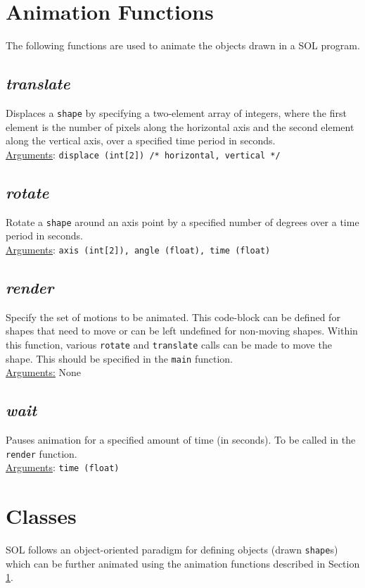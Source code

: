 \documentclass[letterpaper,12pt]{article}
\begin{document}
\section{Animation Functions} \label{animation}
The following functions are used to animate the objects drawn in a SOL program.

\subsection{\textit{translate}}
Displaces a \texttt{shape} by specifying a two-element array of integers, where the first element is the number of pixels along the horizontal axis and the second element along the vertical axis, over a specified time period in seconds.\\
\underline{Arguments}: \texttt{displace (int[2]) /* horizontal, vertical */}

\subsection{\textit{rotate}}
Rotate a \texttt{shape} around an axis point by a specified number of degrees over a time period in seconds.\\
\underline{Arguments}: \texttt{axis (int[2]), angle (float), time (float)}

\subsection{\textit{render}}
Specify the set of motions to be animated. This code-block can be defined for shapes that need to move or can be left undefined for non-moving shapes. Within this function, various \texttt{rotate} and \texttt{translate} calls can be made to move the shape. This should be specified in the \texttt{main} function.\\
\underline{Arguments:} None

\subsection{\textit{wait}}
Pauses animation for a specified amount of time (in seconds). To be called in the \texttt{render} function.\\
\underline{Arguments}: \texttt{time (float)}


\section{Classes}
SOL follows an object-oriented paradigm for defining objects (drawn \texttt{shape}s) which can be further animated using the animation functions described in Section \ref{animation}.
\end{document}

